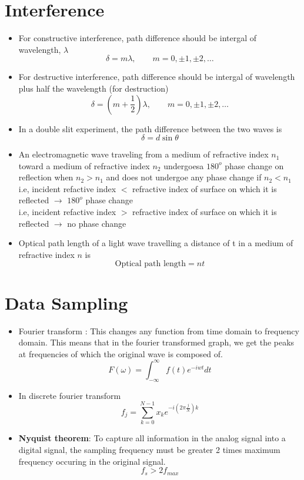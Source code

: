 \documentclass{article}
\begin{document}
\section{Interference}
	\begin{itemize}
		\item For constructive interference, path difference should be intergal of wavelength, $\lambda$
			\[\delta = m \lambda, \qquad m = 0, \pm 1, \pm 2,\hdots\]
		\item For destructive interference, path difference should be intergal of wavelength plus half the wavelength (for destruction)
			\[\delta = (m + \frac{1}{2} )\lambda, \qquad m = 0, \pm 1, \pm 2,\hdots\]

		\item In a double slit experiment, the path difference between the two waves is 
			\[ \delta = d \sin \theta  \] 

		\item An electromagnetic wave traveling from a medium of refractive index $n_1$ toward a medium of refractive index $n_2$ undergoesa $180^o$ phase change on reflection when $n_2>n_1$ and does not undergoe any phase change if $n_2<n_1$\\
			i.e, incident refactive index $<$ refractive index of surface on which it is reflected $\rightarrow$ $180^o$ phase change\\
			i.e, incident refactive index $>$ refractive index of surface on which it is reflected $\rightarrow$ no phase change\\

		\item Optical path length of a light wave travelling a distance of t in a medium of refractive index $n$ is 
			\[\text{Optical path length} = nt\] 

	\end{itemize}

\section{Data Sampling}
	\begin{itemize}
		\item Fourier transform : This changes any function from time domain to frequency domain. This means that in the fourier transformed graph, we get the peaks at frequencies of which the original wave is composed of.
			\[F(\omega) = \int_{- \infty}^\infty f(t) e^{-iwt} dt \] 

		\item In discrete fourier transform
			\[f_j = \sum_{k=0}^{N-1} x_k e^{-i(2\pi\frac{j}{N})k}  \]

		\item \textbf{Nyquist theorem}: To capture all information in the analog signal into a digital signal, the sampling frequency must be greater 2 times maximum frequency occuring in the original signal.
			\[f_s > 2f_{max} \]


	\end{itemize}
\end{document}
